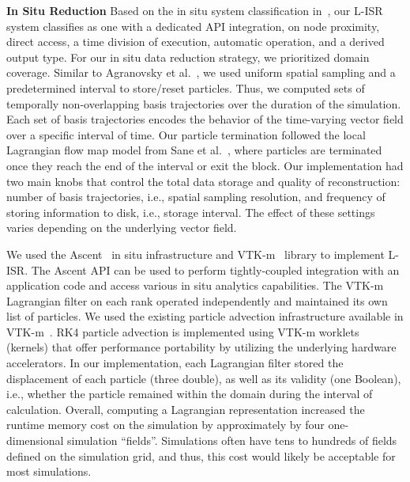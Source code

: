 \noindent\textbf{In Situ Reduction}
%
Based on the in situ system classification in~\cite{childs2020terminology}, our L-ISR system classifies as one with a dedicated API integration, on node proximity, direct access, a time division of execution, automatic operation, and a derived output type.
%
For our in situ data reduction strategy, we prioritized domain coverage.
%
Similar to Agranovsky et al.~\cite{agranovsky2014improved}, we used uniform spatial sampling and a predetermined interval to store/reset particles.
%
Thus, we computed sets of temporally non-overlapping basis trajectories over the duration of the simulation.
%
%
Each set of basis trajectories encodes the behavior of the time-varying vector field over a specific interval of time.
%
%
%
Our particle termination followed the local Lagrangian flow map model from Sane et al.~\cite{sane2020scalable}, where particles are terminated once they reach the end of the interval or exit the block.
%
Our implementation had two main knobs that control the total data storage and quality of reconstruction: number of basis trajectories, i.e., spatial sampling resolution, and frequency of storing information to disk, i.e., storage interval.
%
The effect of these settings varies depending on the underlying vector field. 
%

We used the Ascent~\cite{Larsen2017Alpine} in situ infrastructure and VTK-m~\cite{moreland2016vtk} library to implement L-ISR. 
%
The Ascent API can be used to perform tightly-coupled integration with an application code and access various in situ analytics capabilities.
The VTK-m Lagrangian filter on each rank operated independently and maintained its own list of particles.
%
We used the existing particle advection infrastructure available in VTK-m~\cite{pugmire2018performance}.
%
RK4 particle advection is implemented using VTK-m worklets (kernels) that offer performance portability by utilizing the underlying hardware accelerators.
%
In our implementation, each Lagrangian filter stored the displacement of each particle (three double), as well as its validity (one Boolean), i.e., whether the particle remained within the domain during the interval of calculation.
%
Overall, computing a Lagrangian representation increased the runtime memory cost on the simulation by approximately by four one-dimensional simulation ``fields''.
%
Simulations often have tens to hundreds of fields defined on the simulation grid, and thus, this cost would likely be acceptable for most simulations.
%
%

